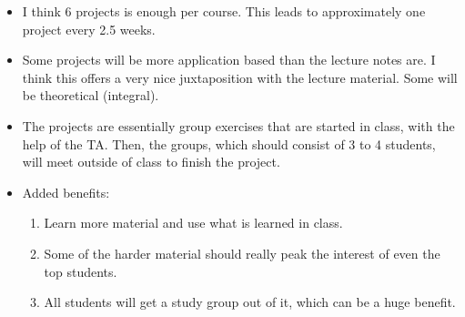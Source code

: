 \documentclass[12pt]{article}
\theoremstyle{definition}
\begin{document}
\begin{itemize}
\item I think 6 projects is enough per course.  This leads to approximately one project every 2.5 weeks.

\item Some projects will be more application based than the lecture notes are.  I think this offers a very nice juxtaposition with the lecture material.   Some will be theoretical (integral).

\item The projects are essentially group exercises that are started in class, with the help of the TA.  Then, the groups, which should consist of 3 to 4 students, will meet outside of class to finish the project.

\item Added benefits:
\begin{enumerate}
	\item Learn more material and use what is learned in class.
	\item Some of the harder material should really peak the interest of even the top students.
	\item All students will get a study group out of it, which can be a huge benefit.
\end{enumerate}

\end{itemize}
\end{document}
